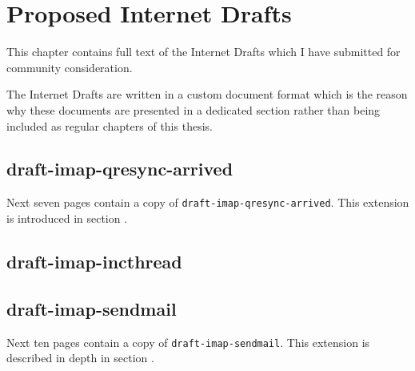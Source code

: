 \documentclass[trojita]{subfiles}
\begin{document}
\chapter{Proposed Internet Drafts}
\label{sec:id-manuscripts}

This chapter contains full text of the Internet Drafts which I have submitted for community consideration.

The Internet Drafts are written in a custom document format which is the reason why these documents are presented in a
dedicated section rather than being included as regular chapters of this thesis.

\section{draft-imap-qresync-arrived}
\label{sec:draft-imap-qresync-arrived}

Next seven pages contain a copy of {\tt draft-imap-qresync-arrived}.  This extension is introduced in section
.



\section{draft-imap-incthread}
\label{sec:draft-imap-incthread}


\section{draft-imap-sendmail}
\label{sec:draft-imap-sendmail}

Next ten pages contain a copy of {\tt draft-imap-sendmail}.  This extension is described in depth in section
.


\end{document}
